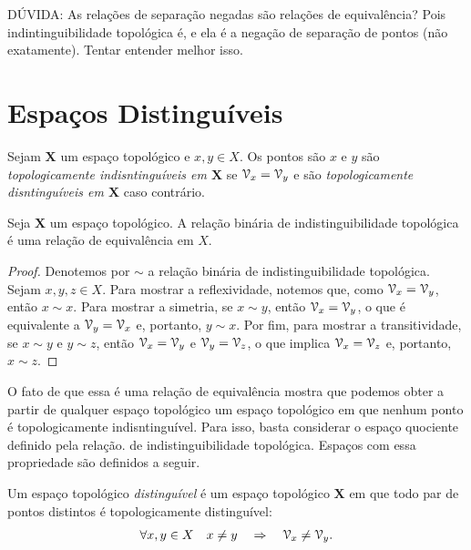 DÚVIDA: As relações de separação negadas são relações de equivalência? Pois indintinguibilidade topológica é, e ela é a negação de separação de pontos (não exatamente). Tentar entender melhor isso.


\section{Espaços Distinguíveis}

\begin{defi}
	Sejam $\bm X$ um espaço topológico e $x,y \in X$. Os pontos são $x$ e $y$ são \emph{topologicamente indisntinguíveis em $\bm X$} se $\mathcal{V}_x = \mathcal{V}_y$ e são \emph{topologicamente disntinguíveis em $\bm X$} caso contrário.
\end{defi}

\begin{prop}
	Seja $\bm X$ um espaço topológico. A relação binária de indistinguibilidade topológica é uma relação de equivalência em $X$.
\end{prop}
\begin{proof}
	Denotemos por $\sim$ a relação binária de indistinguibilidade topológica. Sejam $x,y,z \in X$. Para mostrar a reflexividade, notemos que, como $\mathcal{V}_x=\mathcal{V}_y$, então $x \sim x$. Para mostrar a simetria, se $x \sim y$, então $\mathcal{V}_x=\mathcal{V}_y$, o que é equivalente a $\mathcal{V}_y=\mathcal{V}_x$ e, portanto, $y \sim x$. Por fim, para mostrar a transitividade, se $x \sim y$ e $y \sim z$, então $\mathcal{V}_x=\mathcal{V}_y$ e $\mathcal{V}_y=\mathcal{V}_z$, o que implica $\mathcal{V}_x=\mathcal{V}_z$ e, portanto, $x \sim z$.
\end{proof}

O fato de que essa é uma relação de equivalência mostra que podemos obter a partir de qualquer espaço topológico um espaço topológico em que nenhum ponto é topologicamente indisntinguível. Para isso, basta considerar o espaço quociente definido pela relação. de indistinguibilidade topológica. Espaços com essa propriedade são definidos a seguir.

\begin{defi}[$T_0$]
	Um espaço topológico \emph{distinguível} é um espaço topológico $\bm X$ em que todo par de pontos distintos é topologicamente distinguível:
	\begin{equation*}
	\forall x,y \in X \quad x \neq y \quad \Rightarrow \quad \mathcal{V}_x \neq \mathcal{V}_y.
	\end{equation*}
\end{defi}

